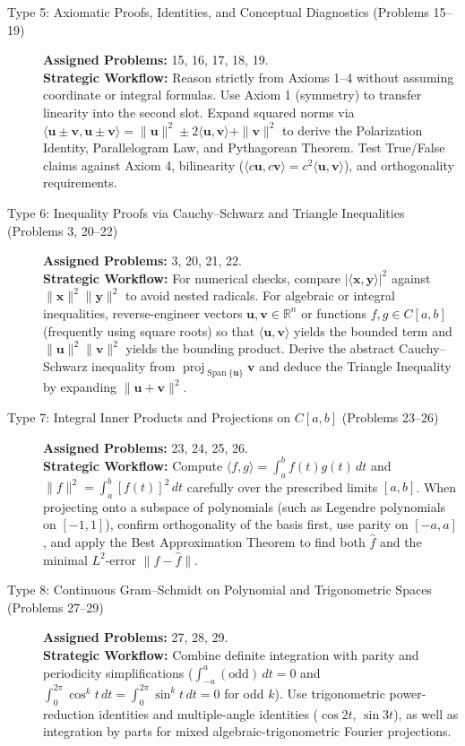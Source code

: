 \documentclass[11pt, letterpaper]{article}
\theoremstyle{definition}
\theoremstyle{remark}
\begin{document}
\begin{description}
    \item[{Type 5: Axiomatic Proofs, Identities, and Conceptual Diagnostics (Problems 15--19)}]
    \textbf{Assigned Problems:} 15, 16, 17, 18, 19.\\
    \textbf{Strategic Workflow:} Reason strictly from Axioms 1--4 without assuming coordinate or integral formulas. Use Axiom 1 (symmetry) to transfer linearity into the second slot. Expand squared norms via $\langle \mathbf{u} \pm \mathbf{v}, \mathbf{u} \pm \mathbf{v} \rangle = \|\mathbf{u}\|^2 \pm 2\langle \mathbf{u}, \mathbf{v} \rangle + \|\mathbf{v}\|^2$ to derive the Polarization Identity, Parallelogram Law, and Pythagorean Theorem. Test True/False claims against Axiom 4, bilinearity ($\langle c\mathbf{u}, c\mathbf{v} \rangle = c^2\langle \mathbf{u}, \mathbf{v} \rangle$), and orthogonality requirements.

    \item[{Type 6: Inequality Proofs via Cauchy--Schwarz and Triangle Inequalities (Problems 3, 20--22)}]
    \textbf{Assigned Problems:} 3, 20, 21, 22.\\
    \textbf{Strategic Workflow:} For numerical checks, compare $|\langle \mathbf{x}, \mathbf{y} \rangle|^2$ against $\|\mathbf{x}\|^2 \|\mathbf{y}\|^2$ to avoid nested radicals. For algebraic or integral inequalities, reverse-engineer vectors $\mathbf{u}, \mathbf{v} \in \mathbb{R}^n$ or functions $f, g \in C[a, b]$ (frequently using square roots) so that $\langle \mathbf{u}, \mathbf{v} \rangle$ yields the bounded term and $\|\mathbf{u}\|^2\|\mathbf{v}\|^2$ yields the bounding product. Derive the abstract Cauchy--Schwarz inequality from $\operatorname{proj}_{\operatorname{Span}\{\mathbf{u}\}} \mathbf{v}$ and deduce the Triangle Inequality by expanding $\|\mathbf{u}+\mathbf{v}\|^2$.

    \item[{Type 7: Integral Inner Products and Projections on {$C[a, b]$} (Problems 23--26)}]
    \textbf{Assigned Problems:} 23, 24, 25, 26.\\
    \textbf{Strategic Workflow:} Compute $\langle f, g \rangle = \int_a^b f(t)g(t)\,dt$ and $\|f\|^2 = \int_a^b [f(t)]^2\,dt$ carefully over the prescribed limits $[a, b]$. When projecting onto a subspace of polynomials (such as Legendre polynomials on $[-1, 1]$), confirm orthogonality of the basis first, use parity on $[-a, a]$, and apply the Best Approximation Theorem to find both $\hat{f}$ and the minimal $L^2$-error $\|f - \hat{f}\|$.

    \item[{Type 8: Continuous Gram--Schmidt on Polynomial and Trigonometric Spaces (Problems 27--29)}]
    \textbf{Assigned Problems:} 27, 28, 29.\\
    \textbf{Strategic Workflow:} Combine definite integration with parity and periodicity simplifications ($\int_{-a}^a (\text{odd})\,dt = 0$ and $\int_0^{2\pi} \cos^k t\,dt = \int_0^{2\pi} \sin^k t\,dt = 0$ for odd $k$). Use trigonometric power-reduction identities and multiple-angle identities ($\cos 2t$, $\sin 3t$), as well as integration by parts for mixed algebraic-trigonometric Fourier projections.


\end{description}
\end{document}
